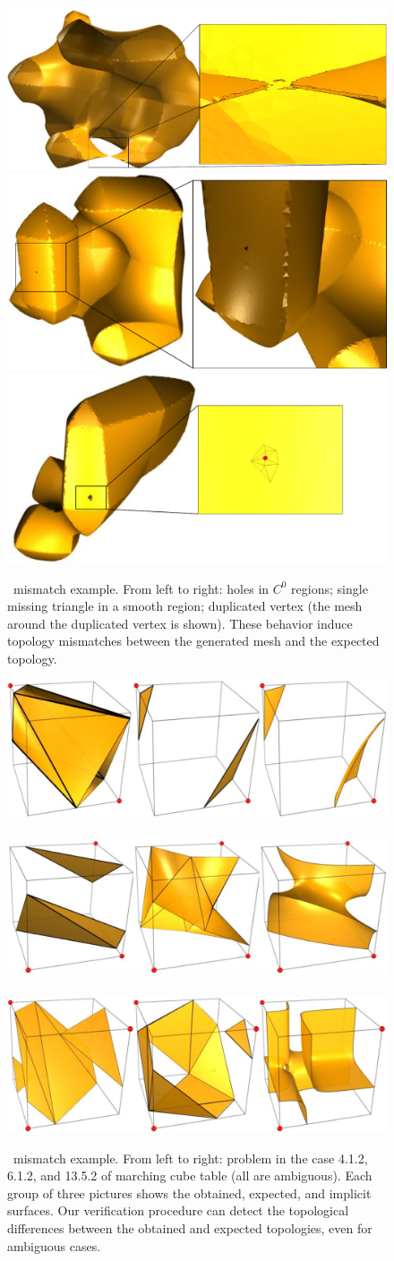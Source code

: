 
\begin{figure}[t]
\centering
\includegraphics[width=0.33\linewidth,keepaspectratio=true]
{chapter3/figures/deliso-case-00.pdf}
\includegraphics[width=0.3\linewidth,keepaspectratio=true]
{chapter3/figures/deliso-case-02.pdf}
\includegraphics[width=0.29\linewidth,keepaspectratio=true]
{chapter3/figures/deliso-case-03.pdf}
\caption{\deliso\ mismatch example. From left to right: holes in $C^0$
  regions; single missing triangle in a smooth region; duplicated
  vertex (the mesh around the duplicated vertex is shown). These
  behavior induce topology mismatches between the generated mesh and
  the expected topology.}
\label{fig:pproblem-deliso}
\end{figure}

\begin{figure}[t]
\centering
\includegraphics[width=0.3\linewidth,keepaspectratio=true]
{chapter3/figures/mc33-case-02.pdf} ~~~~
\includegraphics[width=0.3\linewidth,keepaspectratio=true]
{chapter3/figures/mc33-case-01.pdf} ~~~~
\includegraphics[width=0.3\linewidth,keepaspectratio=true]
{chapter3/figures/mc33-case-00.pdf} 
\caption{\mclewiner\ mismatch example. From left to right: problem in
  the case 4.1.2, 6.1.2, and 13.5.2 of marching cube table (all are
  ambiguous). Each group of three pictures shows the obtained,
  expected, and implicit surfaces. Our verification procedure can
  detect the topological differences between the obtained and expected
  topologies, even for ambiguous cases.}
\label{fig:problem-mclewiner}
\end{figure}


